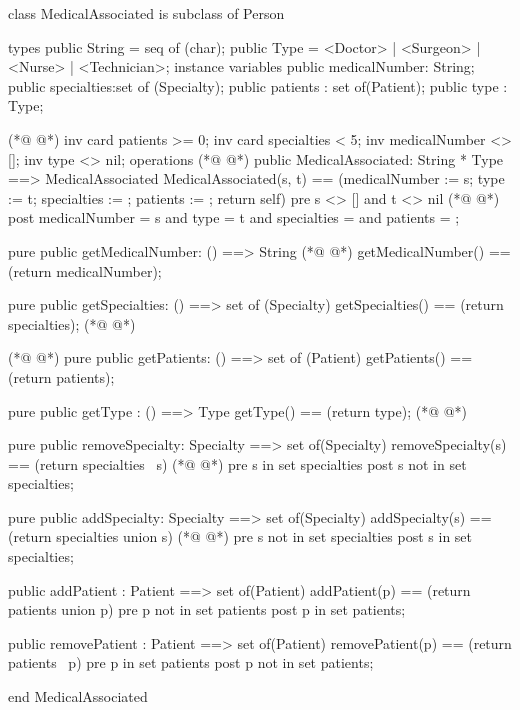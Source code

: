 \begin{vdmpp}[breaklines=true]
class MedicalAssociated is subclass of Person

types
 public String = seq of (char);
 public Type = <Doctor> | <Surgeon> | <Nurse> | <Technician>;
instance variables
  public medicalNumber: String;
  public specialties:set of (Specialty);
  public patients : set of(Patient);
 public type : Type;
 
(*@
\label{MedicalAssociated:12}
@*)
 inv card patients >= 0;
  inv card specialties < 5;
 inv medicalNumber <> [];
 inv type <> nil;
operations
(*@
\label{getMedicalNumber:17}
@*)
 public MedicalAssociated: String * Type ==> MedicalAssociated
  MedicalAssociated(s, t) == (medicalNumber := s; type := t; specialties := {}; patients := {}; return self)
 pre s <> [] and t <> nil
(*@
\label{getSpecialties:20}
@*)
 post medicalNumber = s and type = t and specialties = {} and patients = {};
 
 pure public getMedicalNumber: () ==> String
(*@
\label{removeSpecialty:23}
@*)
  getMedicalNumber() == (return medicalNumber);
 
 pure public getSpecialties: () ==> set of (Specialty)
  getSpecialties() == (return specialties);
(*@
\label{getPatients:27}
@*)
 
(*@
\label{addSpecialty:28}
@*)
 pure public getPatients: () ==> set of (Patient)
  getPatients() == (return patients);
  
 pure public getType : () ==> Type
  getType() == (return type);
(*@
\label{getType:33}
@*)
  
 pure public removeSpecialty: Specialty ==> set of(Specialty)
  removeSpecialty(s) == (return specialties \ {s})
(*@
\label{addPatient:36}
@*)
 pre s in set specialties
 post s not in set specialties;
  
 pure public addSpecialty: Specialty ==> set of(Specialty)
  addSpecialty(s) == (return specialties union {s})
(*@
\label{removePatient:41}
@*)
 pre s not in set specialties
 post s in set specialties;
 
 public addPatient : Patient ==> set of(Patient)
  addPatient(p) == (return patients union {p})
 pre p not in set patients
 post p in set patients;
 
 public removePatient : Patient ==> set of(Patient)
  removePatient(p) == (return patients \ {p})
 pre p in set patients
 post p not in set patients;

end MedicalAssociated
\end{vdmpp}
